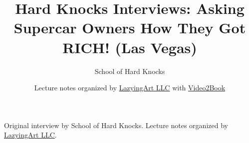 \documentclass[11pt,oneside]{book}
\begin{document}
\frontmatter
\title{Hard Knocks Interviews: Asking Supercar Owners How They Got RICH! (Las Vegas)}
\author{School of Hard Knocks}
\date{Lecture notes organized by \href{https://lazying.art}{LazyingArt LLC} with \href{https://github.com/lachlanchen/Video2Book}{Video2Book}}
\maketitle
\begin{center}
\small Original interview by School of Hard Knocks. Lecture notes organized by \href{https://lazying.art}{LazyingArt LLC}.
\end{center}
\clearpage
\mainmatter

\end{document}
